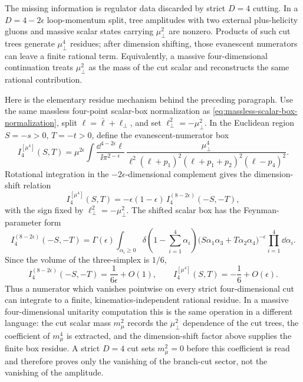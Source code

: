 The missing information is regulator data discarded by strict \(D=4\) cutting.
In a \(D=4-2\epsilon\) loop-momentum split, tree amplitudes with two external
plus-helicity gluons and massive scalar states carrying \(\mu_\perp^2\) are
nonzero.  Products of such cut trees generate \(\mu_\perp^4\) residues; after
dimension shifting, those evanescent numerators can leave a finite rational
term.  Equivalently, a massive four-dimensional continuation treats
\(\mu_\perp^2\) as the mass of the cut scalar and reconstructs the same
rational contribution.

\begin{controlledapproximation}
\label{ca:dimension-shifted-all-plus-rational-residue}
Here is the elementary residue mechanism behind the preceding paragraph.  Use
the same massless four-point scalar-box normalization as
\eqref{eq:massless-scalar-box-normalization}, split
\(\ell=\bar\ell+\ell_\perp\), and set
\(\ell_\perp^2=-\mu_\perp^2\).  In the Euclidean region \(S=-s>0\),
\(T=-t>0\), define the evanescent-numerator box
\[
  I_4^{[\mu^4]}(S,T)
  =
  \mu^{2\epsilon}
  \int\frac{\dd^{4-2\epsilon}\ell}{\ii\pi^{2-\epsilon}}\,
  \frac{\mu_\perp^4}{
    \ell^2
    (\ell+p_1)^2
    (\ell+p_1+p_2)^2
    (\ell-p_4)^2 } .
\]
Rotational integration in the \(-2\epsilon\)-dimensional complement gives the
dimension-shift relation
\begin{equation}
  I_4^{[\mu^4]}(S,T)
  =
  -\epsilon(1-\epsilon)\,
  I_4^{(8-2\epsilon)}(-S,-T),
  \label{eq:mu4-box-dimension-shift}
\end{equation}
with the sign fixed by \(\ell_\perp^2=-\mu_\perp^2\).  The shifted scalar box
has the Feynman-parameter form
\begin{equation}
  I_4^{(8-2\epsilon)}(-S,-T)
  =
  \Gamma(\epsilon)
  \int_{\alpha_i\ge0}
  \delta\!\left(1-\sum_{i=1}^4\alpha_i\right)
  \bigl(S\alpha_1\alpha_3+T\alpha_2\alpha_4\bigr)^{-\epsilon}
  \prod_{i=1}^4\dd\alpha_i .
  \label{eq:shifted-box-simplex-pole}
\end{equation}
Since the volume of the three-simplex is \(1/6\),
\[
  I_4^{(8-2\epsilon)}(-S,-T)
  =
  \frac{1}{6\epsilon}+O(1),
  \qquad
  I_4^{[\mu^4]}(S,T)
  =
  -\frac16+O(\epsilon).
\]
Thus a numerator which vanishes pointwise on every strict four-dimensional cut
can integrate to a finite, kinematics-independent rational residue.  In a
massive four-dimensional unitarity computation this is the same operation in a
different language: the cut scalar mass \(m_\mu^2\) records the
\(\mu_\perp^2\) dependence of the cut trees, the coefficient of \(m_\mu^4\) is
extracted, and the dimension-shift factor above supplies the finite box
residue.  A strict \(D=4\) cut sets \(m_\mu^2=0\) before this coefficient is
read and therefore proves only the vanishing of the branch-cut sector, not the
vanishing of the amplitude.
\end{controlledapproximation}

